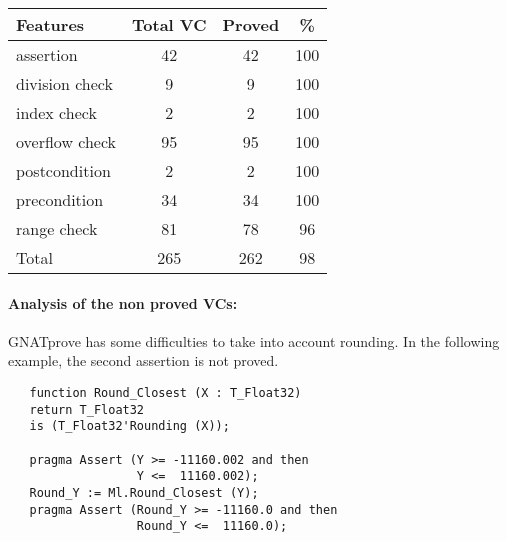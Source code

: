 \documentclass[10pt,a4paper,twocolumn]{article}
\newcommand{\gnatprove}{GNATprove\xspace}
\begin{document}
\begin{tabular}{|l|c|c|c|}
\hline
Features       & Total VC & Proved & \%  \\ %
\hline
assertion      & 42       & 42     & 100 \\ %
\hline
division check & 9        & 9      & 100 \\ %
\hline
index check    & 2        & 2      & 100 \\ %
\hline
overflow check & 95       & 95     & 100 \\ %
\hline
postcondition  & 2        & 2      & 100 \\ %
\hline
precondition   & 34       & 34     & 100 \\ %
\hline
range check    & 81       & 78     & 96  \\ %
\hline
Total          & 265      & 262    & 98  \\ %
\hline
\end{tabular}


\paragraph{Analysis of the non proved VCs:}
\gnatprove has some difficulties to take into account rounding.
In the following example, the second assertion is not proved.

\begin{lstlisting}
   function Round_Closest (X : T_Float32) 
   return T_Float32
   is (T_Float32'Rounding (X));

   pragma Assert (Y >= -11160.002 and then
                  Y <=  11160.002);
   Round_Y := Ml.Round_Closest (Y);
   pragma Assert (Round_Y >= -11160.0 and then
                  Round_Y <=  11160.0);
\end{lstlisting}
\end{document}
